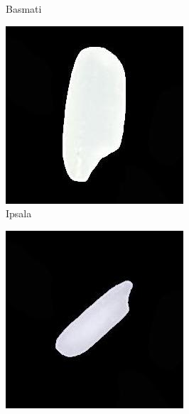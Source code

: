 \documentclass{article}
\begin{document}
\begin{figure} [!htb]
\begin{subfigure}[b]{0.18\textwidth}
		\caption{Basmati}
	\end{subfigure}
	\begin{subfigure}[b]{0.18\textwidth}
		\includegraphics[width= \textwidth]{fg/Ipsala.jpg}
		\caption{Ipsala}
	\end{subfigure}
	\begin{subfigure}[b]{0.18\textwidth}
		\includegraphics[width= \textwidth]{fg/Jasmine.jpg}

\end{subfigure}
\end{figure}
\end{document}
